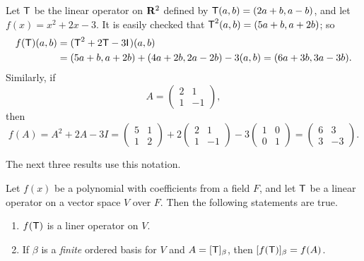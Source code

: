 \begin{example} \label{example e.2}
Let \(\textsf{T}\) be the linear operator on \(\mathbf{R}^2\) defined by \(\textsf{T}(a, b) = (2a + b, a - b)\), and let \(f(x) = x^2 + 2x - 3\).
It is easily checked that \(\textsf{T}^2(a, b) = (5a + b, a + 2b)\); so
\begin{align*}
    f(\textsf{T})(a, b) & = (\textsf{T}^2 + 2\textsf{T} - 3\textsf{I}_{_{}})(a, b) \\
        & = (5a + b, a + 2b) + (4a + 2b, 2a - 2b) - 3(a, b) = (6a + 3b, 3a - 3b).
\end{align*}
Similarly, if
\[
    A = \begin{pmatrix} 2 & 1 \\ 1 & -1 \end{pmatrix},
\]
then
\[
    f(A) = A^2 + 2A - 3I = \begin{pmatrix} 5 & 1 \\ 1 & 2 \end{pmatrix} + 2 \begin{pmatrix} 2 & 1 \\ 1 & -1 \end{pmatrix} - 3 \begin{pmatrix} 1 & 0 \\ 0 & 1 \end{pmatrix} = \begin{pmatrix} 6 & 3 \\ 3 & -3 \end{pmatrix}.
\]
\end{example}

The next three results use this notation.

\begin{appendix theorem} \label{thm e.3}
Let \(f(x)\) be a polynomial with coefficients from a field \(F\), and let \(\textsf{T}\) be a linear operator on a vector space \(V\) over \(F\).
Then the following statements are true.
\begin{enumerate}
\item \(f(\textsf{T})\) is a liner operator on \(V\).
\item If \(\beta\) is a \emph{finite} ordered basis for \(V\) and \(A = [\textsf{T}]_{\beta}\), then \([f(\textsf{T})]_{\beta} = f(A)\).
\end{enumerate}
\end{appendix theorem}

